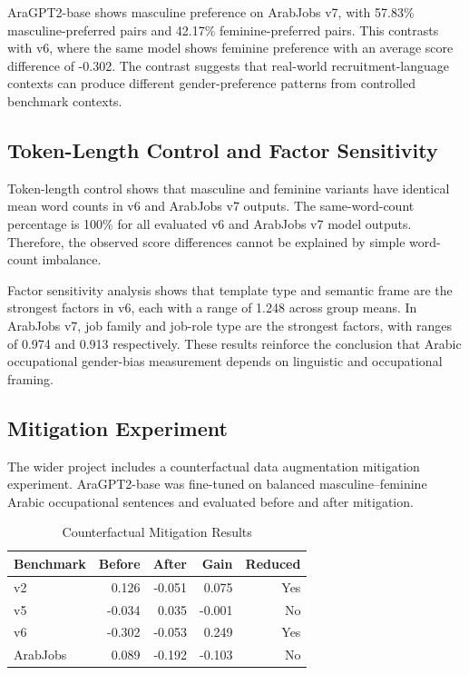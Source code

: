 \documentclass[conference]{IEEEtran}
\begin{document}
AraGPT2-base shows masculine preference on ArabJobs v7, with 57.83\% masculine-preferred pairs and 42.17\% feminine-preferred pairs. This contrasts with v6, where the same model shows feminine preference with an average score difference of -0.302. The contrast suggests that real-world recruitment-language contexts can produce different gender-preference patterns from controlled benchmark contexts.

\subsection{Token-Length Control and Factor Sensitivity}

Token-length control shows that masculine and feminine variants have identical mean word counts in v6 and ArabJobs v7 outputs. The same-word-count percentage is 100\% for all evaluated v6 and ArabJobs v7 model outputs. Therefore, the observed score differences cannot be explained by simple word-count imbalance.

Factor sensitivity analysis shows that template type and semantic frame are the strongest factors in v6, each with a range of 1.248 across group means. In ArabJobs v7, job family and job-role type are the strongest factors, with ranges of 0.974 and 0.913 respectively. These results reinforce the conclusion that Arabic occupational gender-bias measurement depends on linguistic and occupational framing.

\subsection{Mitigation Experiment}

The wider project includes a counterfactual data augmentation mitigation experiment. AraGPT2-base was fine-tuned on balanced masculine--feminine Arabic occupational sentences and evaluated before and after mitigation.

\begin{table}[htbp]
\caption{Counterfactual Mitigation Results}
\begin{center}
\begin{tabular}{lrrrr}
\toprule
Benchmark & Before & After & Gain & Reduced \\
\midrule
v2 & 0.126 & -0.051 & 0.075 & Yes \\
v5 & -0.034 & 0.035 & -0.001 & No \\
v6 & -0.302 & -0.053 & 0.249 & Yes \\
ArabJobs & 0.089 & -0.192 & -0.103 & No \\
\bottomrule
\end{tabular}
\label{tab:mitigation}
\end{center}
\end{table}
\end{document}

